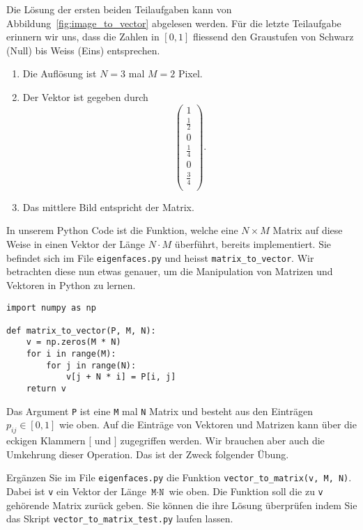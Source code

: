 \begin{losung*}
	Die Lösung der ersten beiden Teilaufgaben kann von Abbildung~\ref{fig:image_to_vector} abgelesen werden.
	Für die letzte Teilaufgabe erinnern wir uns, dass die Zahlen in $\left[0,1\right]$ fliessend den Graustufen von Schwarz (Null) bis Weiss (Eins) entsprechen.
	\begin{enumerate}[label=(\alph*)]
		\item Die Auflösung ist $N=3$ mal $M=2$ Pixel.
		\item Der Vektor ist gegeben durch
		\begin{equation*}
			\begin{pmatrix}
				1 \\
				\frac{1}{2} \\
				0 \\
				\frac{1}{4} \\
				0 \\
				\frac{3}{4} \\
			\end{pmatrix}.
		\end{equation*}
		\item Das mittlere Bild entspricht der Matrix.
	\end{enumerate}
\end{losung*}
In unserem Python Code ist die Funktion, welche eine $N\times M$ Matrix auf diese Weise in einen Vektor der Länge $N\cdot M$ überführt, bereits implementiert.
Sie befindet sich im File \texttt{eigenfaces.py} und heisst \texttt{matrix\_to\_vector}.
Wir betrachten diese nun etwas genauer, um die Manipulation von Matrizen und Vektoren in Python zu lernen.
\begin{lstlisting}[style=python]
import numpy as np

def matrix_to_vector(P, M, N):
	v = np.zeros(M * N)
	for i in range(M):
		for j in range(N):
			v[j + N * i] = P[i, j]
	return v
\end{lstlisting}
Das Argument \texttt{P} ist eine  \texttt{M} mal \texttt{N} Matrix und besteht aus den Einträgen $p_{ij}\in\left[0,1\right]$ wie oben.
Auf die Einträge von Vektoren und Matrizen kann über die eckigen Klammern $[$ und $]$ zugegriffen werden.
Wir brauchen aber auch die Umkehrung dieser Operation.
Das ist der Zweck folgender Übung.
\begin{aufgabe}
	Ergänzen Sie im File \texttt{eigenfaces.py} die Funktion \texttt{vector\_to\_matrix(v, M, N)}.
	Dabei ist \texttt{v} ein Vektor der Länge $\texttt{M}\cdot\texttt{N}$ wie oben.
	Die Funktion soll die zu \texttt{v} gehörende Matrix zurück geben.
	Sie können die ihre Lösung überprüfen indem Sie das Skript \texttt{vector\_to\_matrix\_test.py} laufen lassen.
\end{aufgabe}
